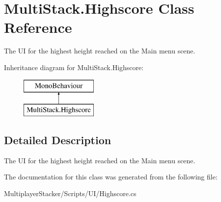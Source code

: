 \hypertarget{class_multi_stack_1_1_highscore}{}\section{Multi\+Stack.\+Highscore Class Reference}
\label{class_multi_stack_1_1_highscore}


The U\+I for the highest height reached on the Main menu scene.  


Inheritance diagram for Multi\+Stack.\+Highscore\+:\begin{figure}[H]
\begin{center}
\leavevmode
\includegraphics[height=2.000000cm]{class_multi_stack_1_1_highscore}
\end{center}
\end{figure}


\subsection{Detailed Description}
The U\+I for the highest height reached on the Main menu scene. 



The documentation for this class was generated from the following file\+:\begin{DoxyCompactItemize}
\item 
Multiplayer\+Stacker/\+Scripts/\+U\+I/Highscore.\+cs\end{DoxyCompactItemize}
